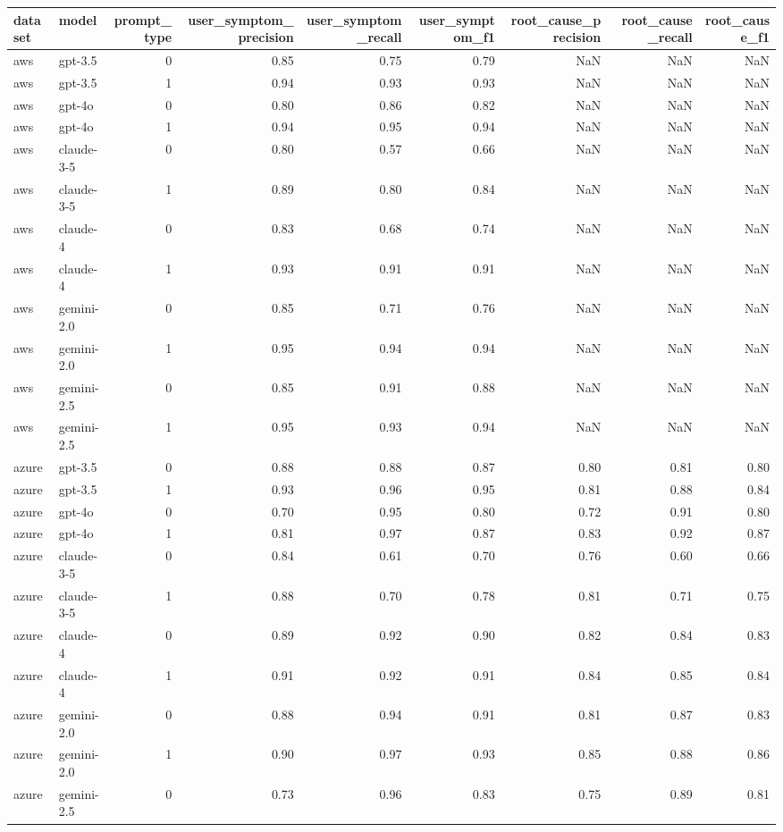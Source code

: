 \begin{tabular}{llrrrrrrr}
\toprule
dataset & model & prompt_type & user_symptom_precision & user_symptom_recall & user_symptom_f1 & root_cause_precision & root_cause_recall & root_cause_f1 \\
\midrule
aws & gpt-3.5 & 0 & 0.85 & 0.75 & 0.79 & NaN & NaN & NaN \\
aws & gpt-3.5 & 1 & 0.94 & 0.93 & 0.93 & NaN & NaN & NaN \\
aws & gpt-4o & 0 & 0.80 & 0.86 & 0.82 & NaN & NaN & NaN \\
aws & gpt-4o & 1 & 0.94 & 0.95 & 0.94 & NaN & NaN & NaN \\
aws & claude-3-5 & 0 & 0.80 & 0.57 & 0.66 & NaN & NaN & NaN \\
aws & claude-3-5 & 1 & 0.89 & 0.80 & 0.84 & NaN & NaN & NaN \\
aws & claude-4 & 0 & 0.83 & 0.68 & 0.74 & NaN & NaN & NaN \\
aws & claude-4 & 1 & 0.93 & 0.91 & 0.91 & NaN & NaN & NaN \\
aws & gemini-2.0 & 0 & 0.85 & 0.71 & 0.76 & NaN & NaN & NaN \\
aws & gemini-2.0 & 1 & 0.95 & 0.94 & 0.94 & NaN & NaN & NaN \\
aws & gemini-2.5 & 0 & 0.85 & 0.91 & 0.88 & NaN & NaN & NaN \\
aws & gemini-2.5 & 1 & 0.95 & 0.93 & 0.94 & NaN & NaN & NaN \\
azure & gpt-3.5 & 0 & 0.88 & 0.88 & 0.87 & 0.80 & 0.81 & 0.80 \\
azure & gpt-3.5 & 1 & 0.93 & 0.96 & 0.95 & 0.81 & 0.88 & 0.84 \\
azure & gpt-4o & 0 & 0.70 & 0.95 & 0.80 & 0.72 & 0.91 & 0.80 \\
azure & gpt-4o & 1 & 0.81 & 0.97 & 0.87 & 0.83 & 0.92 & 0.87 \\
azure & claude-3-5 & 0 & 0.84 & 0.61 & 0.70 & 0.76 & 0.60 & 0.66 \\
azure & claude-3-5 & 1 & 0.88 & 0.70 & 0.78 & 0.81 & 0.71 & 0.75 \\
azure & claude-4 & 0 & 0.89 & 0.92 & 0.90 & 0.82 & 0.84 & 0.83 \\
azure & claude-4 & 1 & 0.91 & 0.92 & 0.91 & 0.84 & 0.85 & 0.84 \\
azure & gemini-2.0 & 0 & 0.88 & 0.94 & 0.91 & 0.81 & 0.87 & 0.83 \\
azure & gemini-2.0 & 1 & 0.90 & 0.97 & 0.93 & 0.85 & 0.88 & 0.86 \\
azure & gemini-2.5 & 0 & 0.73 & 0.96 & 0.83 & 0.75 & 0.89 & 0.81 \\

\end{tabular}
